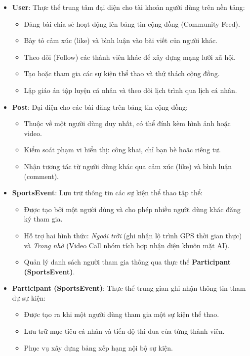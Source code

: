 \begin{itemize}
    \item \textbf{User}: Thực thể trung tâm đại diện cho tài khoản người dùng trên nền tảng:
    \begin{itemize}
        \item Đăng bài chia sẻ hoạt động lên bảng tin cộng đồng (Community Feed).
        \item Bày tỏ cảm xúc (like) và bình luận vào bài viết của người khác.
        \item Theo dõi (Follow) các thành viên khác để xây dựng mạng lưới xã hội.
        \item Tạo hoặc tham gia các sự kiện thể thao và thử thách cộng đồng.
        \item Lập giáo án tập luyện cá nhân và theo dõi lịch trình qua lịch cá nhân.
    \end{itemize}

    \item \textbf{Post}: Đại diện cho các bài đăng trên bảng tin cộng đồng:
    \begin{itemize}
        \item Thuộc về một người dùng duy nhất, có thể đính kèm hình ảnh hoặc video.
        \item Kiểm soát phạm vi hiển thị: công khai, chỉ bạn bè hoặc riêng tư.
        \item Nhận tương tác từ người dùng khác qua cảm xúc (like) và bình luận (comment).
    \end{itemize}

    \item \textbf{SportsEvent}: Lưu trữ thông tin các sự kiện thể thao tập thể:
    \begin{itemize}
        \item Được tạo bởi một người dùng và cho phép nhiều người dùng khác đăng ký tham gia.
        \item Hỗ trợ hai hình thức: \textit{Ngoài trời} (ghi nhận lộ trình GPS thời gian thực) và \textit{Trong nhà} (Video Call nhóm tích hợp nhận diện khuôn mặt AI).
        \item Quản lý danh sách người tham gia thông qua thực thể \textbf{Participant (SportsEvent)}.
    \end{itemize}

    \item \textbf{Participant (SportsEvent)}: Thực thể trung gian ghi nhận thông tin tham dự sự kiện:
    \begin{itemize}
        \item Được tạo ra khi một người dùng tham gia một sự kiện thể thao.
        \item Lưu trữ mục tiêu cá nhân và tiến độ thi đua của từng thành viên.
        \item Phục vụ xây dựng bảng xếp hạng nội bộ sự kiện.
    \end{itemize}


\end{itemize}
